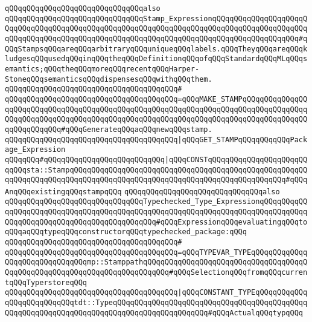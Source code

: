 \newline
\newline
\newline
\verb|qQQqqQQqqQQqqQQqqQQqqQQqqQQqqQQqalso|\newline
\verb|qQQqqQQqqQQqqQQqqQQqqQQqqQQqqQQqStamp_ExpressionqQQqqQQqqQQqqQQqqQQqqQQqqQQqqQQqqQQqqQQqqQQqqQQqqQQqqQQqqQQqqQQqqQQqqQQqqQQqqQQqqQQqqQQqqQQqqQQqqQQqqQQqqQQqqQQqqQQqqQQqqQQqqQQqqQQqqQQqqQQqqQQqqQQqqQQqqQQqqQQq#qQQqStampsqQQqareqQQqarbitraryqQQquniqueqQQqlabels.qQQqTheyqQQqareqQQqkludgesqQQqusedqQQqinqQQqtheqQQqDefinitionqQQqofqQQqStandardqQQqMLqQQqsemantics;qQQqtheqQQqmoreqQQqrecentqQQqHarper-StoneqQQqsemanticsqQQqdispensesqQQqwithqQQqthem.|\newline
\verb|qQQqqQQqqQQqqQQqqQQqqQQqqQQqqQQqqQQqqQQq#|\newline
\verb|qQQqqQQqqQQqqQQqqQQqqQQqqQQqqQQqqQQqqQQq=qQQqMAKE_STAMPqQQqqQQqqQQqqQQqqQQqqQQqqQQqqQQqqQQqqQQqqQQqqQQqqQQqqQQqqQQqqQQqqQQqqQQqqQQqqQQqqQQqqQQqqQQqqQQqqQQqqQQqqQQqqQQqqQQqqQQqqQQqqQQqqQQqqQQqqQQqqQQqqQQqqQQqqQQqqQQqqQQqqQQq#qQQqGenerateqQQqaqQQqnewqQQqstamp.|\newline
\verb|qQQqqQQqqQQqqQQqqQQqqQQqqQQqqQQqqQQqqQQq|\verb#|qQQqGET_STAMPqQQqqQQqqQQqPackage_Expression#\newline
\verb|qQQqqQQq#qQQqqQQqqQQqqQQqqQQqqQQqqQQq|\verb#|qQQqCONSTqQQqqQQqqQQqqQQqqQQqqQQqqQQqsta::StampqQQqqQQqqQQqqQQqqQQqqQQqqQQqqQQqqQQqqQQqqQQqqQQqqQQqqQQqqQQqqQQqqQQqqQQqqQQqqQQqqQQqqQQqqQQqqQQqqQQqqQQqqQQqqQQqqQQqqQQq#\verb|#qQQqAnqQQqexistingqQQqstampqQQq|\newline
\newline
\newline
\newline
\newline
\verb|qQQqqQQqqQQqqQQqqQQqqQQqqQQqqQQqalso|\newline
\verb|qQQqqQQqqQQqqQQqqQQqqQQqqQQqqQQqTypechecked_Type_ExpressionqQQqqQQqqQQqqQQqqQQqqQQqqQQqqQQqqQQqqQQqqQQqqQQqqQQqqQQqqQQqqQQqqQQqqQQqqQQqqQQqqQQqqQQqqQQqqQQqqQQqqQQqqQQqqQQqqQQq#qQQqExpressionqQQqevaluatingqQQqtoqQQqaqQQqtypeqQQqconstructorqQQqtypechecked_package:qQQq|\newline
\verb|qQQqqQQqqQQqqQQqqQQqqQQqqQQqqQQqqQQqqQQq#|\newline
\verb|qQQqqQQqqQQqqQQqqQQqqQQqqQQqqQQqqQQqqQQq=qQQqTYPEVAR_TYPEqQQqqQQqqQQqqQQqqQQqqQQqqQQqqQQqmp::StamppathqQQqqQQqqQQqqQQqqQQqqQQqqQQqqQQqqQQqqQQqqQQqqQQqqQQqqQQqqQQqqQQqqQQqqQQqqQQq#qQQqSelectionqQQqfromqQQqcurrentqQQqTyperstoreqQQq|\newline
\verb|qQQqqQQqqQQqqQQqqQQqqQQqqQQqqQQqqQQqqQQq|\verb#|qQQqCONSTANT_TYPEqQQqqQQqqQQqqQQqqQQqqQQqqQQqtdt::TypeqQQqqQQqqQQqqQQqqQQqqQQqqQQqqQQqqQQqqQQqqQQqqQQqqQQqqQQqqQQqqQQqqQQqqQQqqQQqqQQqqQQqqQQqqQQq#\verb|#qQQqActualqQQqtypqQQq|\newline
